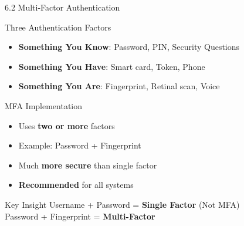 \documentclass{beamer}
\begin{document}
	\begin{frame}{6.2 Multi-Factor Authentication}
		\begin{block}{Three Authentication Factors}
			\begin{itemize}
				\item \textbf{Something You Know}: Password, PIN, Security Questions
				\item \textbf{Something You Have}: Smart card, Token, Phone
				\item \textbf{Something You Are}: Fingerprint, Retinal scan, Voice
			\end{itemize}
		\end{block}
		
		\begin{block}{MFA Implementation}
			\begin{itemize}
				\item Uses \textbf{two or more} factors
				\item Example: Password + Fingerprint
				\item Much \textbf{more secure} than single factor
				\item \textbf{Recommended} for all systems
			\end{itemize}
		\end{block}
		
		\begin{exampleblock}{Key Insight}
			Username + Password = \textbf{Single Factor} (Not MFA) \\
			Password + Fingerprint = \textbf{Multi-Factor}
		\end{exampleblock}
	\end{frame}
	
\end{document}
